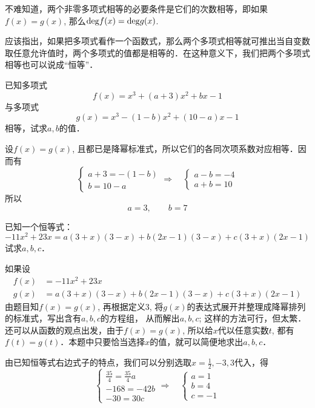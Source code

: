 不难知道，两个非零多项式相等的必要条件是它们的次数相等，即如果$f(x)=g(x)$, 那么${\rm deg}f(x)={\rm deg}g(x)$.

应该指出，如果把多项式看作一个函数式，那么两个多项式相等就可推出当自变数取任意允许值时，两个多项式的值都是相等的．在这种意义下，我们把两个多项式相等也可以说成“恒等”．

\begin{example}
已知多项式
\[f (x) =x^3+ (a+3) x^2+bx-1\]
与多项式
\[g (x) =x^3- (1-b) x^2+ (10-a) x-1\]
相等，试求$a,b$的值．    
\end{example}

\begin{solution}
设$f(x)=g(x)$, 且都已是降幂标准式，所以它们的各同次项系数对应相等．因而有    
\[\begin{cases}
    a+3=-(1-b)\\b=10-a
\end{cases}\Rightarrow\quad
\begin{cases}
    a-b=-4\\ a+b=10
\end{cases}\]
所以
\[a=3,\qquad b=7\]
\end{solution}

\begin{example}
已知一个恒等式：
\[-11x^2+23x=a(3+x)(3-x)+b(2x-1)(3-x)+c(3+x)(2x-1)\]
试求$a,b,c$．
\end{example}

\begin{analyze}
如果设
\[\begin{split}
    f(x)&=-11x^2+23x\\
    g(x)&=a(3+x)(3-x)+b(2x-1)(3-x)+c(3+x)(2x-1)
\end{split}\]
由题目知$f(x)=g(x)$, 再根据定义3, 将$g(x)$的表达式展开并整理成降幂排列的标准式，写出含有$a,b,c$的方程组，
从而解出$a,b,c$; 这样的方法可行，但太繁．还可以从函数的观点出发，由于$f(x)=g(x)$, 所以给$x$代以任意实数$t$, 都有$f(t)=g(t)$．本题中只要恰当选择$x$的值，就可以简便地求出$a,b,c$．
\end{analyze}

\begin{solution}
由已知恒等式右边式子的特点，我们可以分别选取$x=\frac{1}{2},-3, 3$代入，得
\[\begin{cases}
    \frac{35}{4}=\frac{35}{4}a\\
    -168=-42b\\
    -30=30c
\end{cases}\Rightarrow\quad \begin{cases}
    a=1\\b=4\\c=-1
\end{cases}\]
\end{solution}

